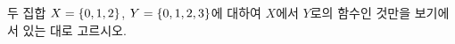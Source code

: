 두 집합 $X=\{0{,}\mkern3mu\mathopen{}1{,}\mkern3mu\mathopen{}2\}$, $Y=\{0{,}\mkern3mu\mathopen{}1{,}\mkern3mu\mathopen{}2{,}\mkern3mu\mathopen{}3\}$에 대하여 $X$에서 $Y$로의 함수인 것만을 보기에서 있는 대로 고르시오. 
